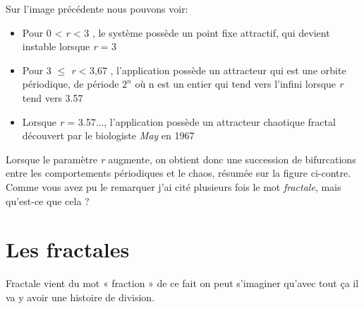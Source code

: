 \documentclass[french,11pt]{report}
\begin{document}
Sur l'image précédente nous pouvons voir:
\begin{itemize}
    \item Pour 0 < \textit{r} < 3 , le système possède un point fixe attractif, qui devient instable lorsque \textit{r} = 3
    \item Pour 3 \begin{math}\le\end{math} \textit{r} < 3,67 , l'application possède un attracteur qui est une orbite périodique, de période     
    \begin{math} 2^n 
     \end{math} où n est un entier qui tend vers l'infini lorsque \textit{r} tend vers 3.57
    \item Lorsque \textit{r} = 3.57..., l'application possède un attracteur chaotique fractal découvert par le biologiste \textit{May} en 1967
\end{itemize}

Lorsque le paramètre \textit{r} augmente, on obtient donc une succession de bifurcations entre les comportements périodiques et le chaos, résumée sur la figure ci-contre.
Comme vous avez pu le remarquer j’ai cité plusieurs fois le mot \textit{fractale}, mais qu’est-ce que cela ?



\chapter{Les fractales}

Fractale vient du mot « fraction » de ce fait on peut s’imaginer qu’avec tout ça il va y avoir une histoire de division.
\end{document}

